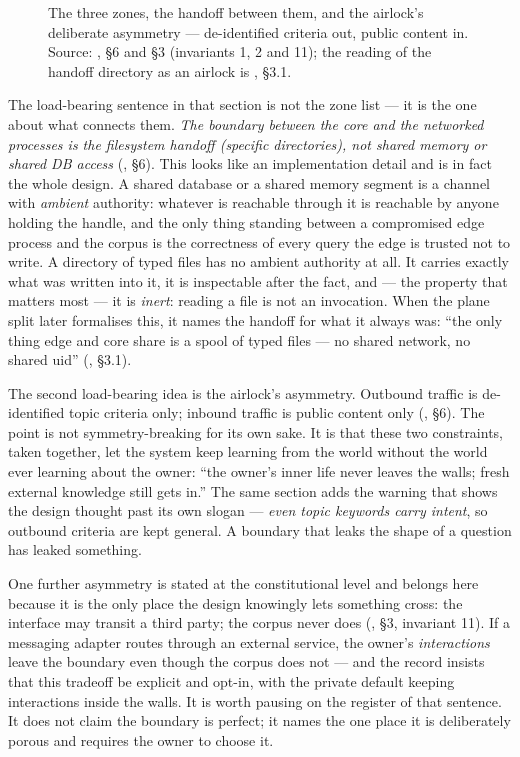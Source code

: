 \begin{figure}[t]
  \centering
  
  \caption[The trust zones and the airlock]{The three zones, the handoff between
    them, and the airlock's deliberate asymmetry --- de-identified criteria out,
    public content in. Source: , \S 6 and
    \S 3 (invariants 1, 2 and 11); the reading of the handoff directory as an
    airlock is , \S 3.1.}
  \label{fig:trust-zones}
\end{figure}

The load-bearing sentence in that section is not the zone list --- it is the one
about what connects them. \emph{The boundary between the core and the networked
processes is the filesystem handoff (specific directories), not shared memory or
shared DB access} (, \S 6). This looks like an
implementation detail and is in fact the whole design. A shared database or a
shared memory segment is a channel with \emph{ambient} authority: whatever is
reachable through it is reachable by anyone holding the handle, and the only thing
standing between a compromised edge process and the corpus is the correctness of
every query the edge is trusted not to write. A directory of typed files has no
ambient authority at all. It carries exactly what was written into it, it is
inspectable after the fact, and --- the property that matters most --- it is
\emph{inert}: reading a file is not an invocation. When the plane split later
formalises this, it names the handoff for what it always was: ``the only thing edge
and core share is a spool of typed files --- no shared network, no shared uid''
(, \S 3.1).

The second load-bearing idea is the airlock's asymmetry. Outbound traffic is
de-identified topic criteria only; inbound traffic is public content only
(, \S 6). The point is not symmetry-breaking
for its own sake. It is that these two constraints, taken together, let the system
keep learning from the world without the world ever learning about the owner: ``the
owner's inner life never leaves the walls; fresh external knowledge still gets
in.'' The same section adds the warning that shows the design thought past its own
slogan --- \emph{even topic keywords carry intent}, so outbound criteria are kept
general. A boundary that leaks the shape of a question has leaked something.

One further asymmetry is stated at the constitutional level and belongs here
because it is the only place the design knowingly lets something cross: the
interface may transit a third party; the corpus never does
(, \S 3, invariant 11). If a messaging adapter
routes through an external service, the owner's \emph{interactions} leave the
boundary even though the corpus does not --- and the record insists that this
tradeoff be explicit and opt-in, with the private default keeping interactions
inside the walls. It is worth pausing on the register of that sentence. It does not
claim the boundary is perfect; it names the one place it is deliberately porous and
requires the owner to choose it.


